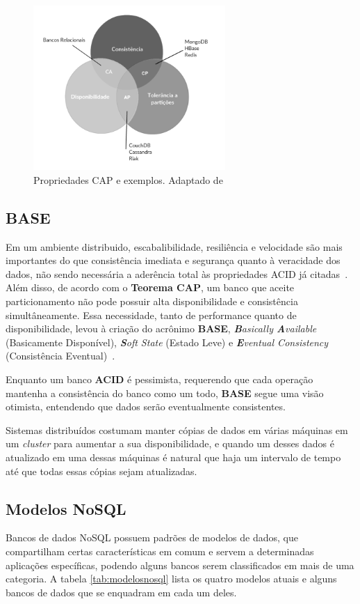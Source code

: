 \begin{figure}[!htb]
\centering
\includegraphics[width=0.65\textwidth]{figuras/cappb.png}
\caption{Propriedades CAP e exemplos. Adaptado de ~\cite{blograshid}}
\label{fig:capnosql}
\end{figure}

\subsection{BASE}
    Em um ambiente distribuido, escabalibilidade, resiliência e velocidade são mais importantes do que consistência imediata e segurança quanto à veracidade dos  dados, não sendo necessária a aderência total às propriedades ACID já citadas~\cite{neo4j_acidbase}. Além disso, de acordo com o \textbf{Teorema CAP}, um banco que aceite particionamento não pode possuir alta disponibilidade e consistência simultâneamente. Essa necessidade, tanto de performance quanto de disponibilidade, levou à criação do acrônimo \textbf{BASE}, \emph{\textbf{B}asically \textbf{A}vailable} (Basicamente Disponível), \emph{\textbf{S}oft State} (Estado Leve) e \emph{\textbf{E}ventual Consistency} (Consistência Eventual)~\cite{foxcluster}. 
    
    Enquanto um banco \textbf{ACID} é pessimista, requerendo que cada operação mantenha a consistência do banco como um todo, \textbf{BASE} segue uma visão otimista, entendendo que dados serão eventualmente consistentes.
    
    Sistemas distribuídos costumam manter cópias de dados em várias máquinas em um \emph{cluster} para aumentar a sua disponibilidade, e quando um desses dados é atualizado em uma dessas máquinas é natural que haja um intervalo de tempo até que todas essas cópias sejam atualizadas.

\subsection{Modelos NoSQL}
Bancos de dados NoSQL possuem padrões de modelos de dados, que compartilham certas características em comum e servem a determinadas aplicações específicas, podendo alguns bancos serem classificados em mais de uma categoria. A tabela \ref{tab:modelosnosql} lista os quatro modelos atuais e alguns bancos de dados que se enquadram em cada um deles.

